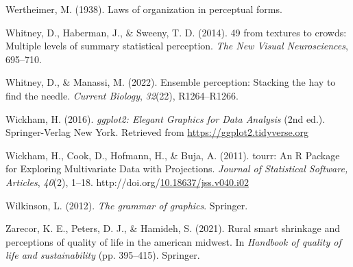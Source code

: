 \documentclass[print]{nuthesis}
\newlength{\cslhangindent}
\newenvironment{CSLReferences}[2]%
{\setlength{\parindent}{0pt}%
\everypar{\setlength{\hangindent}{\cslhangindent}}\ignorespaces}%
{\par}
\begin{document}
\begin{CSLReferences}{1}{0}
\leavevmode{}%
Wertheimer, M. (1938). Laws of organization in perceptual forms.

\leavevmode{}%
Whitney, D., Haberman, J., \& Sweeny, T. D. (2014). 49 from textures to crowds: Multiple levels of summary statistical perception. \emph{The New Visual Neurosciences}, 695--710.

\leavevmode{}%
Whitney, D., \& Manassi, M. (2022). Ensemble perception: Stacking the hay to find the needle. \emph{Current Biology}, \emph{32}(22), R1264--R1266.

\leavevmode{}%
Wickham, H. (2016). \emph{{ggplot2: Elegant Graphics for Data Analysis}} (2nd ed.). Springer-Verlag New York. Retrieved from \url{https://ggplot2.tidyverse.org}

\leavevmode{}%
Wickham, H., Cook, D., Hofmann, H., \& Buja, A. (2011). {tourr: An R Package for Exploring Multivariate Data with Projections}. \emph{Journal of Statistical Software, Articles}, \emph{40}(2), 1--18. http://doi.org/\href{https://doi.org/10.18637/jss.v040.i02}{10.18637/jss.v040.i02}

\leavevmode{}%
Wilkinson, L. (2012). \emph{The grammar of graphics}. Springer.

\leavevmode{}%
Zarecor, K. E., Peters, D. J., \& Hamideh, S. (2021). Rural smart shrinkage and perceptions of quality of life in the american midwest. In \emph{Handbook of quality of life and sustainability} (pp. 395--415). Springer.

\end{CSLReferences}


\backmatter

% 






\end{document}

